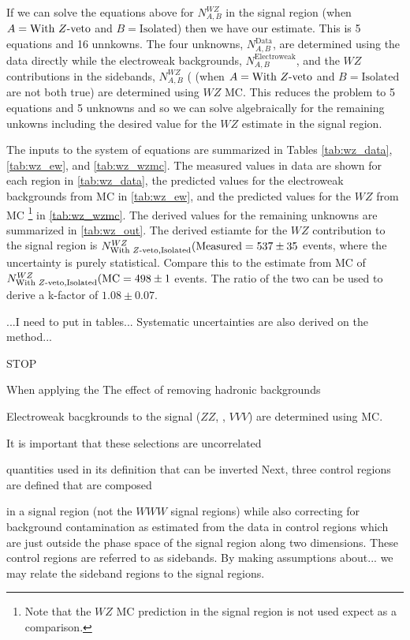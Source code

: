 If we can solve the equations above for $N^{WZ}_{A,B}$ in the signal region
(when $A=\textrm{With \ensuremath{Z}-veto}$ and $B=\textrm{Isolated}$)
then we have our estimate. 
This is 5 equations and 16 unnkowns. The four unknowns, $N^{\textrm{Data}}_{A,B}$,
are determined using the data directly while 
the electroweak backgrounds, $N^{\textrm{Electroweak}}_{A,B}$,
and the $WZ$ contributions in the sidebands, $N^{WZ}_{A,B}$ (
(when $A=\textrm{With \ensuremath{Z}-veto}$ and $B=\textrm{Isolated}$ are not both true)
are determined using $WZ$ MC. This reduces the problem to 5 equations
and 5 unknowns and so we can solve algebraically for the remaining unkowns
including the desired value for the $WZ$ estimate in the signal region.

The inputs to the system of equations are summarized in 
Tables \ref{tab:wz_data}, \ref{tab:wz_ew}, and \ref{tab:wz_wzmc}.
The measured values in data are shown for each region in \tab\ref{tab:wz_data}, 
the predicted values for the electroweak backgrounds from MC in 
\tab\ref{tab:wz_ew}, and the predicted values for the $WZ$ from MC
\footnote{Note that the $WZ$ MC prediction in the signal region is not used
expect as a comparison.} in
\tab\ref{tab:wz_wzmc}.
The derived values for the remaining unknowns are summarized in 
\tab\ref{tab:wz_out}. The derived estiamte for the $WZ$ contribution to 
the signal region is 
$N^{WZ}_{\textrm{With \ensuremath{Z}-veto},\textrm{Isolated}}(\textrm{Measured}=537 \pm 35$
events, where the uncertainty is purely statistical. 
Compare this to the estimate from MC of 
$N^{WZ}_{\textrm{With \ensuremath{Z}-veto},\textrm{Isolated}}(\textrm{MC}=498 \pm 1$ events.
The ratio of the two can be used to derive a k-factor of
$1.08\pm0.07$.

...I need to put in tables...
Systematic uncertainties are also derived on the method...


STOP

When applying the 
The effect of removing hadronic backgrounds 

Electroweak bacgkrounds to the signal ($ZZ$, \ttV, $VVV$) 
are determined using MC.




It is important that these selections are uncorrelated

quantities used in its definition that can be inverted
Next, three control regions are defined that
are composed 

in a signal region
(not the $WWW$ signal regions)
while also correcting for background contamination
as estimated from the data in 
control regions which are just outside the phase space
of the signal region along two dimensions.
These control regions are referred to as sidebands.
By making assumptions about...
we may relate the sideband regions to the signal regions.

